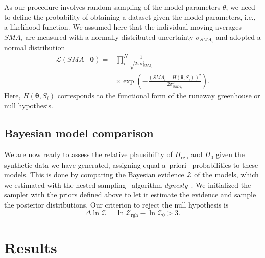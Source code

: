 \documentclass[twocolumn,twocolappendix]{aastex631}
\begin{document}
As our procedure involves random sampling of the model parameters $\theta$, we need to define the probability of obtaining a dataset given the model parameters, i.e., a likelihood function.
We assumed here that the individual moving averages $SMA_i$ are measured with a normally distributed uncertainty $\sigma_{SMA_i}$ and adopted a normal distribution
\begin{eqnarray}
    \mathcal{L}(SMA \mid \boldsymbol{\theta})= & \prod_{i}^{N} \frac{1}{\sqrt{2 \pi \sigma_{SMA_i}^{2}}} \\
    & \times \exp \left(-\frac{\left(SMA_i - H\left(\boldsymbol{\theta}, S_i\right)\right)^{2}}{2 \sigma_{SMA_i}^{2}}\right).
\end{eqnarray}
Here, $H\left(\boldsymbol{\theta}, S_i\right)$ corresponds to the functional form of the runaway greenhouse or null hypothesis.


\subsection{Bayesian model comparison}
We are now ready to assess the relative plausibility of $H_{\mathrm{rgh}}$ and $H_0$ given the synthetic data we have generated, assigning equal a~priori~ probabilities to these models.
This is done by comparing the Bayesian evidence $\mathcal{Z}$ of the models, which we estimated with the nested sampling~\citep{Skilling2004} algorithm \emph{dynesty}~\citep{Speagle2020}.
We initialized the sampler with the priors defined above to let it estimate the evidence and sample the posterior distributions.
Our criterion to reject the null hypothesis is
\begin{equation}
\Delta \ln \mathcal{Z}  = \ln \mathcal{Z}_\mathrm{rgh} - \ln \mathcal{Z}_0  > 3.
\end{equation}




\section{Results}\label{sec:results}
\end{document}
